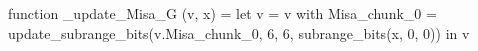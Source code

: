 function _update_Misa_G (v, x) = let v = { v with Misa_chunk_0 = update_subrange_bits(v.Misa_chunk_0, 6, 6, subrange_bits(x, 0, 0)) } in
  v
